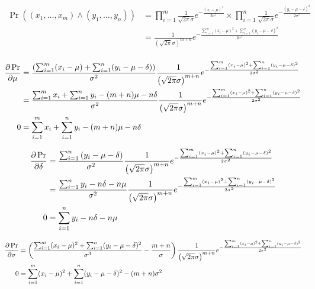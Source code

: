 \documentclass[10pt,\jkfside,a4paper]{article}
\begin{document}
\begin{enumerate}
\[
\begin{split}
\Pr((x_1, \dots, x_m) \wedge (y_1, \dots, y_n)) &=
\prod^m_{i=1} \frac{1}{\sqrt{2\pi}\sigma}e^{-\frac{(x_i -\mu)^2}{2\sigma^2}}
\times \prod^n_{i=1} \frac{1}{\sqrt{2\pi}\sigma}e^{-\frac{(y_i -\mu -
\delta)^2}{2\sigma^2}} \\
&=
\frac{1}{\left(\sqrt{2\pi}\sigma\right)^{m + n}} e^{-\frac{\sum^m_{i=1}(x_i -
\mu)^2 + \sum^n_{i=1}(y_i - \mu - \delta)^2}{2\sigma^2}} \\
\end{split}
\]

\[
\begin{split}
\pdv{\Pr}{\mu} &= \frac{\left(\sum^m_{i=1}(x_i - \mu) + \sum^n_{i=1}(y_i -
\mu - \delta)\right)}{\sigma^2}\frac{1}{\left(\sqrt{2\pi}\sigma\right)
^{m + n}} e^{-\frac{\sum^m_{i=1}(x_i -\mu)^2 + \sum^n_{i=1}(y_i - \mu - \delta)
^2}{2\sigma^2}} \\
&= \frac{\sum^{m}_{i=1} x_i + \sum^{n}_{i=1} y_i - (m + n)\mu - n\delta}
{\sigma^2}\frac{1}{\left(\sqrt{2\pi}\sigma\right)^{m + n}}
e^{-\frac{\sum^m_{i=1}(x_i -\mu)^2 + \sum^n_{i=1}(y_i - \mu - \delta)
^2}{2\sigma^2}} \\
0 &= \sum^{m}_{i=1} x_i + \sum^{n}_{i=1} y_i - (m + n)\mu - n\delta \\
\end{split}
\]

\[
\begin{split}
\pdv{\Pr}{\delta} &= \frac{\sum^n_{i=1}\left(y_i - \mu - \delta \right)
}{\sigma^2}\frac{1}{\left(\sqrt{2\pi}\sigma\right)^{m + n}} e^{-\frac{
\sum^m_{i=1}(x_i - \mu)^2 + \sum^n_{i=1}(y_i - \mu - \delta)^2}{2\sigma^2}} \\
&= \frac{\sum^n_{i=1} y_i - n\delta - n\mu}{\sigma^2}
 \frac{1}{\left (\sqrt{2\pi}\sigma\right)^{m + n}} e^{-\frac{\sum^m_{i=1}(x_i -
\mu)^2 + \sum^n_{i=1}(y_i - \mu - \delta)^2}{2\sigma^2}} \\
0 &= \sum^n_{i=1} y_i - n\delta - n\mu\\
\end{split}
\]

\[
\begin{split}
\pdv{\Pr}{\sigma} &= \left( \frac{\sum^m_{i=1}(x_i - \mu)^2 + \sum^n_{i=1}
(y_i - \mu - \delta)^2}{\sigma^3} - \frac{m + n}{\sigma} \right)
\frac{1}{\left (\sqrt{2\pi}\sigma\right)^{m + n}} e^{-\frac{\sum^m_{i=1}(x_i -
\mu)^2 + \sum^n_{i=1}(y_i - \mu - \delta)^2}{2\sigma^2}} \\
0 &= \sum^m_{i=1}(x_i - \mu)^2 + \sum^n_{i=1} (y_i - \mu - \delta)^2 - (m +
n)\sigma^2
\end{split}
\]


\end{enumerate}
\end{document}
